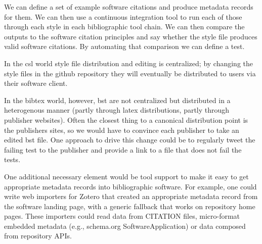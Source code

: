 \documentclass[a4paper,UKenglish]{dagman}
\begin{document}
We can define a set of example software citations and produce metadata records for them. We can then use a continuous integration tool to run each of those through each style in each bibliographic tool chain. We can then compare the outputs to the software citation principles and say whether the style file produces valid software citations. By automating that comparison we can define a test.

In the csl world style file distribution and editing is centralized; by changing the style files in the github repository they will eventually be distributed to users via their software client.

In the bibtex world, however, bst are not centralized but distributed in a heterogenous manner (partly through latex distributions, partly through publisher websites). Often the closest thing to a canonical distribution point is the publishers sites, so we would have to convince each publisher to take an edited bst file.  One approach to drive this change could be to regularly tweet the failing test to the publisher and provide a link to a file that does not fail the tests.

One additional necessary element would be tool support to make it easy to get appropriate metadata records into bibliographic software. For example, one could write web importers for Zotero that created an appropriate metadata record from the software landing page, with a generic fallback that works on repository home pages. These importers could read data from CITATION files, micro-format embedded metadata (e.g., schema.org SoftwareApplication) or data composed from repository APIs.
\end{document}
